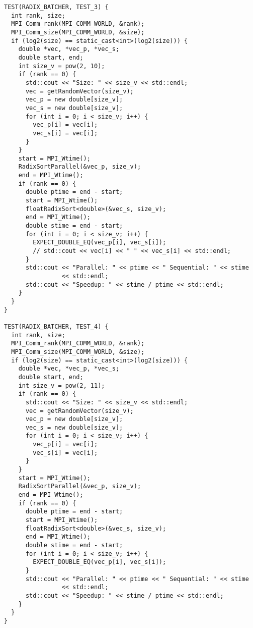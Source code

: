 \documentclass{report}
\begin{document}
\begin{lstlisting}
TEST(RADIX_BATCHER, TEST_3) {
  int rank, size;
  MPI_Comm_rank(MPI_COMM_WORLD, &rank);
  MPI_Comm_size(MPI_COMM_WORLD, &size);
  if (log2(size) == static_cast<int>(log2(size))) {
    double *vec, *vec_p, *vec_s;
    double start, end;
    int size_v = pow(2, 10);
    if (rank == 0) {
      std::cout << "Size: " << size_v << std::endl;
      vec = getRandomVector(size_v);
      vec_p = new double[size_v];
      vec_s = new double[size_v];
      for (int i = 0; i < size_v; i++) {
        vec_p[i] = vec[i];
        vec_s[i] = vec[i];
      }
    }
    start = MPI_Wtime();
    RadixSortParallel(&vec_p, size_v);
    end = MPI_Wtime();
    if (rank == 0) {
      double ptime = end - start;
      start = MPI_Wtime();
      floatRadixSort<double>(&vec_s, size_v);
      end = MPI_Wtime();
      double stime = end - start;
      for (int i = 0; i < size_v; i++) {
        EXPECT_DOUBLE_EQ(vec_p[i], vec_s[i]);
        // std::cout << vec[i] << " " << vec_s[i] << std::endl;
      }
      std::cout << "Parallel: " << ptime << " Sequential: " << stime
                << std::endl;
      std::cout << "Speedup: " << stime / ptime << std::endl;
    }
  }
}

TEST(RADIX_BATCHER, TEST_4) {
  int rank, size;
  MPI_Comm_rank(MPI_COMM_WORLD, &rank);
  MPI_Comm_size(MPI_COMM_WORLD, &size);
  if (log2(size) == static_cast<int>(log2(size))) {
    double *vec, *vec_p, *vec_s;
    double start, end;
    int size_v = pow(2, 11);
    if (rank == 0) {
      std::cout << "Size: " << size_v << std::endl;
      vec = getRandomVector(size_v);
      vec_p = new double[size_v];
      vec_s = new double[size_v];
      for (int i = 0; i < size_v; i++) {
        vec_p[i] = vec[i];
        vec_s[i] = vec[i];
      }
    }
    start = MPI_Wtime();
    RadixSortParallel(&vec_p, size_v);
    end = MPI_Wtime();
    if (rank == 0) {
      double ptime = end - start;
      start = MPI_Wtime();
      floatRadixSort<double>(&vec_s, size_v);
      end = MPI_Wtime();
      double stime = end - start;
      for (int i = 0; i < size_v; i++) {
        EXPECT_DOUBLE_EQ(vec_p[i], vec_s[i]);
      }
      std::cout << "Parallel: " << ptime << " Sequential: " << stime
                << std::endl;
      std::cout << "Speedup: " << stime / ptime << std::endl;
    }
  }
}


\end{lstlisting}
\end{document}
